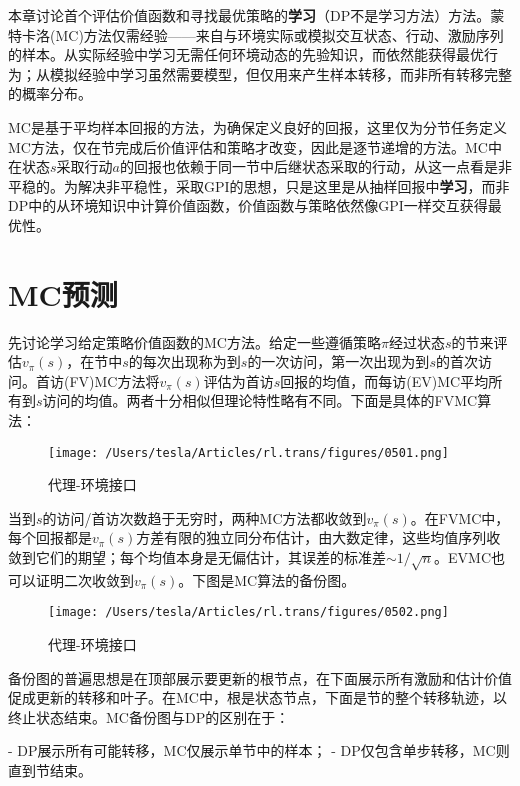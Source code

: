 \documentclass{ctexart}
\begin{document}
本章讨论首个评估价值函数和寻找最优策略的\textbf{学习}（DP不是学习方法）方法。蒙特卡洛(MC)方法仅需经验——来自与环境实际或模拟交互状态、行动、激励序列的样本。从实际经验中学习无需任何环境动态的先验知识，而依然能获得最优行为；从模拟经验中学习虽然需要模型，但仅用来产生样本转移，而非所有转移完整的概率分布。

MC是基于平均样本回报的方法，为确保定义良好的回报，这里仅为分节任务定义MC方法，仅在节完成后价值评估和策略才改变，因此是逐节递增的方法。MC中在状态$s$采取行动$a$的回报也依赖于同一节中后继状态采取的行动，从这一点看是非平稳的。为解决非平稳性，采取GPI的思想，只是这里是从抽样回报中\textbf{学习}，而非DP中的从环境知识中计算价值函数，价值函数与策略依然像GPI一样交互获得最优性。



\section{MC预测}

先讨论学习给定策略价值函数的MC方法。给定一些遵循策略$\pi$经过状态$s$的节来评估$v_\pi(s)$，在节中$s$的每次出现称为到$s$的一次访问，第一次出现为到$s$的首次访问。首访(FV)MC方法将$v_\pi(s)$评估为首访$s$回报的均值，而每访(EV)MC平均所有到$s$访问的均值。两者十分相似但理论特性略有不同。下面是具体的FVMC算法：

\begin{figure}[htbp]
    \centering
    \texttt{[image: /Users/tesla/Articles/rl.trans/figures/0501.png]}
    \caption{代理-环境接口}
    \label{fig:0501} 
\end{figure}

当到$s$的访问/首访次数趋于无穷时，两种MC方法都收敛到$v_\pi(s)$。在FVMC中，每个回报都是$v_\pi(s)$方差有限的独立同分布估计，由大数定律，这些均值序列收敛到它们的期望；每个均值本身是无偏估计，其误差的标准差$\sim 1/\sqrt{n}$。EVMC也可以证明二次收敛到$v_\pi(s)$。下图是MC算法的备份图。

\begin{figure}[htbp]
    \centering
    \texttt{[image: /Users/tesla/Articles/rl.trans/figures/0502.png]}
    \caption{代理-环境接口}
    \label{fig:0502} 
\end{figure}

备份图的普遍思想是在顶部展示要更新的根节点，在下面展示所有激励和估计价值促成更新的转移和叶子。在MC中，根是状态节点，下面是节的整个转移轨迹，以终止状态结束。MC备份图与DP的区别在于：

- DP展示所有可能转移，MC仅展示单节中的样本；
- DP仅包含单步转移，MC则直到节结束。
\end{document}
